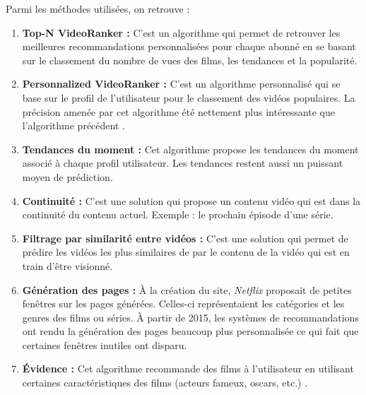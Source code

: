 Parmi les méthodes utilisées, on retrouve :
\begin{enumerate}
    \item \textbf{Top-N VideoRanker :} C'est un algorithme qui permet de retrouver les meilleures recommandations personnalisées pour chaque abonné en se basant sur le classement du nombre de vues des films, les tendances et la popularité.\\
    
    \item \textbf{Personnalized VideoRanker :} C'est un algorithme personnalisé qui se base sur le profil de l'utilisateur pour le classement des vidéos populaires. La précision amenée par cet algorithme été nettement plus intéressante que l'algorithme précédent \cite{netflix}.\\
    
    \item \textbf{Tendances du moment :} Cet algorithme propose les tendances du moment associé à chaque profil utilisateur. Les tendances restent aussi un puissant moyen de prédiction.\\
    
    \item \textbf{Continuité :} C'est une solution qui propose un contenu vidéo qui est dans la continuité du contenu actuel. Exemple : le prochain épisode d'une série.\\
    
    \item \textbf{Filtrage par similarité entre vidéos :} C'est une solution qui permet de prédire les vidéos les plus similaires de par le contenu de la vidéo qui est en train d'être visionné.\\
    
    \item \textbf{Génération des pages :} À la création du site, \emph{Netflix} proposait de petites fenêtres sur les pages générées. Celles-ci représentaient les catégories et les genres des films ou séries. À partir de 2015, les systèmes de recommandations ont rendu la génération des pages beaucoup plus personnalisée ce qui fait que certaines fenêtres inutiles ont disparu.\\
    
    \item \textbf{Évidence :} Cet algorithme recommande des films à l'utilisateur en utilisant certaines caractéristiques des films (acteurs fameux, oscars, etc.) \cite{netflix}.
\end{enumerate}

